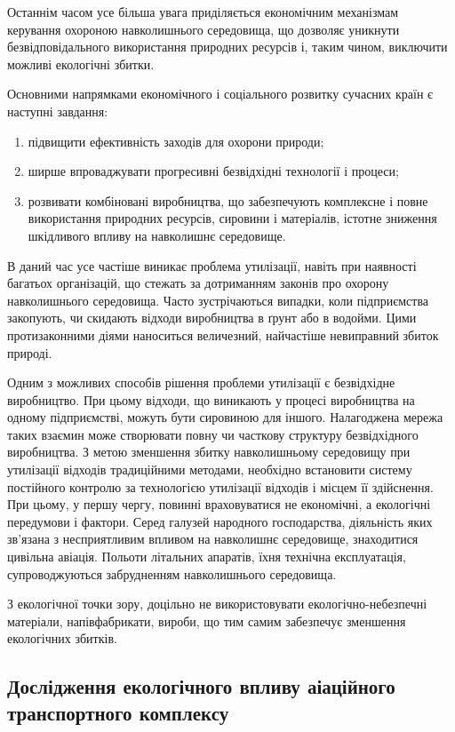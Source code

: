 Останнім часом усе більша увага приділяється економічним механізмам керування охороною навколишнього середовища, що дозволяє уникнути безвідповідального використання природних ресурсів і, таким чином, виключити можливі екологічні збитки.

Основними напрямками економічного і соціального розвитку сучасних країн є наступні завдання:

\begin{enumerate}
 \item підвищити ефективність заходів для охорони природи;
 \item ширше впроваджувати прогресивні безвідхідні технології і процеси;
 \item розвивати комбіновані виробництва, що забезпечують комплексне і повне використання природних ресурсів, сировини і матеріалів, істотне зниження шкідливого впливу на навколишнє середовище.
\end{enumerate}

В даний час усе частіше виникає проблема утилізації, навіть при наявності багатьох організацій, що стежать за дотриманням законів про охорону навколишнього середовища. Часто зустрічаються випадки, коли підприємства закопують, чи скидають відходи виробництва в ґрунт або в водойми. Цими протизаконними діями наноситься величезний, найчастіше невиправний збиток природі.

Одним з можливих способів рішення проблеми утилізації є безвідхідне виробництво. При цьому відходи, що виникають у процесі виробництва на одному підприємстві, можуть бути сировиною для іншого. Налагоджена мережа таких взаємин може створювати повну чи часткову структуру безвідхідного виробництва. З метою зменшення збитку навколишньому середовищу при утилізації відходів традиційними методами, необхідно встановити систему постійного контролю за технологією утилізації відходів і місцем її здійснення. При цьому, у першу чергу, повинні враховуватися не економічні, а екологічні передумови і фактори. Серед галузей народного господарства, діяльність яких зв'язана з несприятливим впливом на навколишнє середовище, знаходитися цивільна авіація. Польоти літальних апаратів, їхня технічна експлуатація, супроводжуються забрудненням навколишнього середовища.

З екологічної точки зору, доцільно не використовувати екологічно-небезпечні матеріали, напівфабрикати, вироби, що тим самим забезпечує зменшення екологічних збитків.

\subsection{Дослідження екологічного впливу аіаційного транспортного комплексу}


